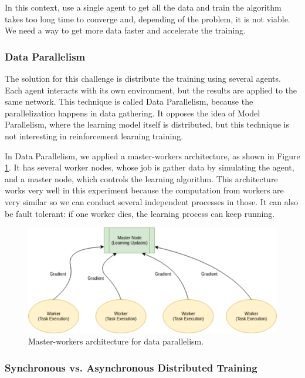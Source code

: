 In this context, use a single agent to get all the data and train the algorithm takes too long time to converge and, depending of the problem, it is not viable. We need a way to get more data faster and accelerate the training.

\subsubsection{Data Parallelism}

The solution for this challenge is distribute the training using several agents. Each agent interacts with its own environment, but the results are applied to the same network. This technique is called Data Parallelism, because the parallelization happens in data gathering. It opposes the idea of Model Parallelism, where the learning model itself is distributed, but this technique is not interesting in reinforcement learning training.

In Data Parallelism, we applied a master-workers architecture, as shown in Figure \ref{fig:master-worker}. It has several worker nodes, whose job is gather data by simulating the agent, and a master node, which controls the learning algorithm. This architecture works very well in this experiment because the computation from workers are very similar so we can conduct several independent processes in those. It can also be fault tolerant: if one worker dies, the learning process can keep running.

\begin{figure}[!htbp]
	\centering
	\includegraphics[width=1.1\textwidth]{Cap5/master-worker.eps}
	\caption{ Master-workers architecture for data parallelism.
	}
	\label{fig:master-worker}
\end{figure}

\subsubsection{Synchronous vs. Asynchronous Distributed Training}

